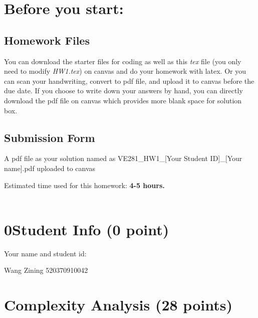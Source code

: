 \documentclass[11pt]{exam}
\begin{document}
\setlength{\parindent}{0pt}
\section*{Before you start:}

\subsection*{Homework Files}
You can download the starter files for coding as well as this \textit{tex} file (you only need to modify \textit{HW1.tex}) on canvas and do your homework with latex. Or you can scan your handwriting, convert to pdf file, and upload it to canvas before the due date. If you choose to write down your answers by hand, you can directly download the pdf file on canvas which provides more blank space for solution box.\\

\subsection*{Submission Form}
A pdf file as your solution named as VE281\_HW1\_[Your Student ID]\_[Your name].pdf uploaded to canvas

Estimated time used for this homework: \textbf{4-5 hours.}
\\\\

\newpage
\section*{0\quad Student Info (0 point)}
Your name and student id:
\begin{solution}
    Wang Zining 520370910042
\end{solution}

\section{Complexity Analysis (28 points)}
\end{document}
